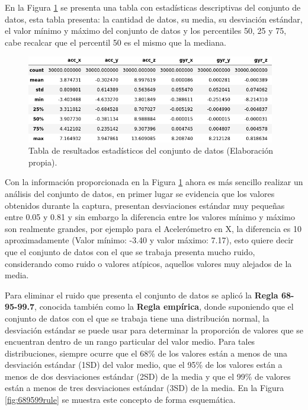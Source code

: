 \vspace{5mm} %

En la Figura \ref{tab: est} se presenta una tabla con estad\'{i}sticas descriptivas del conjunto de datos, esta tabla presenta: la cantidad de datos, su media, su desviaci\'{o}n est\'{a}ndar, el valor m\'{i}nimo y m\'{a}ximo del conjunto de datos y los percentiles 50, 25 y 75, cabe recalcar que el percentil 50 es el mismo que la mediana.

\begin{figure}[h!]
  \begin{center}	\includegraphics[width=0.97\textwidth,frame]{imagenes/Cap3/describe_data}
  \caption{Tabla de resultados estad\'{i}sticos del conjunto de datos (Elaboraci\'{o}n propia).}
  \label{tab: est}
  \end{center}
\end{figure}

\vspace{5mm} %

Con la informaci\'{o}n proporcionada en la Figura \ref{tab: est} ahora es m\'{a}s sencillo realizar un an\'{a}lisis del conjunto de datos, en primer lugar se evidencia que los valores obtenidos durante la captura, presentan desviaciones est\'{a}ndar muy peque\~{n}as entre 0.05 y 0.81 y sin embargo la diferencia entre los valores m\'{i}nimo y m\'{a}ximo son realmente grandes, por ejemplo para el Aceler\'{o}metro en X, la diferencia es 10 aproximadamente (Valor m\'{i}nimo: -3.40 y valor m\'{a}ximo: 7.17), esto quiere decir que el conjunto de datos con el que se trabaja presenta mucho ruido, considerando como ruido o valores at\'{i}picos, aquellos valores muy alejados de la media. 

\vspace{5mm} %

Para eliminar el ruido que presenta el conjunto de datos se aplic\'{o} la \textbf{Regla 68-95-99.7}, conocida tambi\'{e}n como la \textbf{Regla emp\'{i}rica}, donde suponiendo que el conjunto de datos con el que se trabaja tiene una distribuci\'{o}n normal, la desviaci\'{o}n est\'{a}ndar se puede usar para determinar la proporci\'{o}n de valores que se encuentran dentro de un rango particular del valor medio. Para tales distribuciones, siempre ocurre que el 68\% de los valores est\'{a}n a menos de una desviaci\'{o}n est\'{a}ndar (1SD) del valor medio, que el 95\% de los valores est\'{a}n a menos de dos desviaciones est\'{a}ndar (2SD) de la media y que el 99\% de valores est\'{a}n a menos de tres desviaciones est\'{a}ndar (3SD) de la media. En la Figura \ref{fig:689599rule} se muestra este concepto de forma esquem\'{a}tica.

